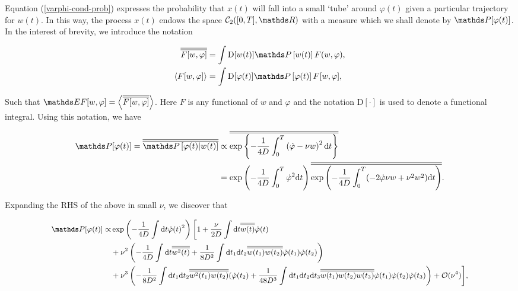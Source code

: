 Equation (\ref{varphi-cond-prob}) expresses the probability that $x(t)$ will fall into a small `tube' around $\varphi(t)$ given a particular trajectory for $w(t)$. In this way, the process $x(t)$ endows the space $\mathcal{C}_2([0,T],\bR)$ with a measure which we shall denote by $\bP[\varphi(t)]$. In the interest of brevity, we introduce the notation 

\begin{align}
\begin{split}
        \Overline{F[w,\varphi]}&=\int \mathrm{D}[w(t)]\bP\left[w(t)\right]F(w,\varphi), \\
        \langle F[w,\varphi] \rangle &= \int \mathrm{D}[\varphi(t)]\bP\left [ \varphi(t) \right]F[w,\varphi],
\end{split}
\end{align}

Such that $\bE F[w,\varphi] = \left\langle \Overline{F[w,\varphi]} \right\rangle$. Here $F$ is any functional of $w$ and $\varphi$ and the notation $\mathrm{D}[\cdot]$ is used to denote a functional integral. Using this notation, we have 

\begin{align}
\begin{split}
\bP[\varphi(t)] = \Overline{\bP\left[\varphi(t)|w(t)\right]} &\propto \Overline{\exp \left\{-\frac{1}{4D} \int_0^T  \left(\dot{\varphi}-\nu w\right)^2 \rmd t \right\}}\\ 
&=  \exp \left(-\frac{1}{4D} \int_0^T  \dot{\varphi}^2 \rmd t\right) \Overline{\exp \left(-\frac{1}{4D} \int_0^T  (-2\dot{\varphi}\nu w + \nu^2 w^2) \rmd t\right)}.
\end{split}
\end{align}

Expanding the RHS of the above in small $\nu$, we discover that 

\begin{align}\label{forward-path-prob}
\small
\begin{split}
\bP[\varphi(t)] \propto &\exp \left(-\frac{1}{4D} \int \rmd t \dot{\varphi}(t)^2 \right) \bigg[1+\frac{\nu}{2D}\int \rmd t \Overline{w(t)}\dot{\varphi}(t) \\ &+ \nu^2 \left(-\frac{1}{4D}\int \rmd t \Overline{w^2(t)} + \frac{1}{8D^2}\int \rmd t_1 \rmd t_2 \Overline{w(t_1)w(t_2)}\dot{\varphi}(t_1)\dot{\varphi}(t_2)\right) \\
     &+ \nu^3 \left( -\frac{1}{8D^2}\int \rmd t_1\rmd t_2 \Overline{w^2(t_1)w(t_2)}(\dot{\varphi}(t_2) + \frac{1}{48D^3}\int \rmd t_1 \rmd t_2 \rmd t_3 \Overline{w(t_1)w(t_2)w(t_3)}\dot{\varphi}(t_1)\dot{\varphi}(t_2)\dot{\varphi}(t_3) \right) + \mathcal{O}(\nu^4) \bigg],
\end{split}
\end{align}

